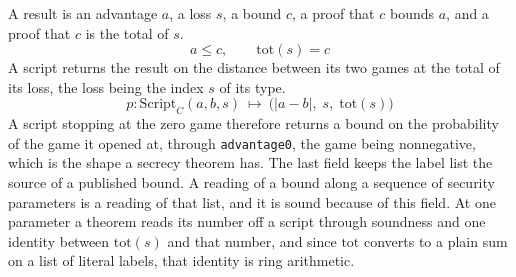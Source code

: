 \begin{definition}
  \label{def:script_result}
  \rocqok
  A result is an advantage $a$, a loss $s$, a bound $c$, a proof that $c$
  bounds $a$, and a proof that $c$ is the total of $s$.
  \[ a \le c, \qquad \mathrm{tot}(s) = c \]
  A script returns the result on the distance between its two games at the
  total of its loss, the loss being the index $s$ of its type.
  \[ p : \mathrm{Script}_C(a, b, s) \ \longmapsto\
       \big(\lvert a - b \rvert,\; s,\; \mathrm{tot}(s)\big) \]
  A script stopping at the zero game therefore returns a bound on the
  probability of the game it opened at, through \texttt{advantage0}, the game
  being nonnegative, which is the shape a secrecy theorem
  has. The last field keeps the label list the source of a published bound. A
  reading of a bound along a sequence of security parameters is a reading of
  that list, and it is sound because of this field. At one parameter a theorem
  reads its number off a script through soundness and one identity between
  $\mathrm{tot}(s)$ and that number, and since $\mathrm{tot}$ converts to a
  plain sum on a list of literal labels, that identity is ring arithmetic.
\end{definition}

